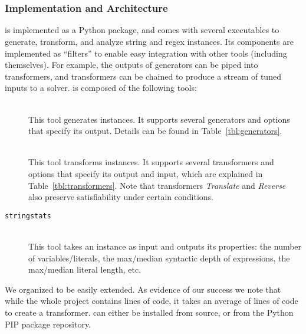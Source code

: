 \section{\fuzzer{}}
\label{sec:fuzzer}

\subsubsection{Implementation and Architecture}

\fuzzer{} is implemented as a Python package, and comes with several
executables to generate, transform, and analyze \smtfull{} string and regex
instances. Its components are implemented as \unix{} ``filters'' to enable easy
integration with other tools (including themselves). For example, the
outputs of generators can be piped into transformers, and transformers
can be chained to produce a stream of tuned inputs to a
solver. \fuzzer{} is composed of the following tools:
\begin{description}
    \item[\generator{}] \hfill \\
    This tool generates \smt{} instances. It supports several generators and
    options that specify its output. Details can be found in
    Table~\ref{tbl:generators}.
    \item[\transformer{}] \hfill \\
    This tool transforms \smt{}
    instances. It supports several transformers and options that specify
    its output and input, which are explained in
    Table~\ref{tbl:transformers}. Note that transformers
    \textit{Translate} and \textit{Reverse} also preserve
    satisfiability under certain conditions.
    \item[\texttt{stringstats}] \hfill \\
    This tool takes an \smt{}
    instance as input and outputs its properties: the number of
    variables/literals, the max/median syntactic depth of expressions, the
    max/median literal length, etc.
\end{description}
We organized \fuzzer{} to be easily extended. As evidence of our success we note
that while the whole project
contains \linesInFuzzer{} lines of code, it takes an average of
\linesPerX{} lines of code to create a transformer. \fuzzer{} can either be
installed from source, or from the Python PIP package repository.

